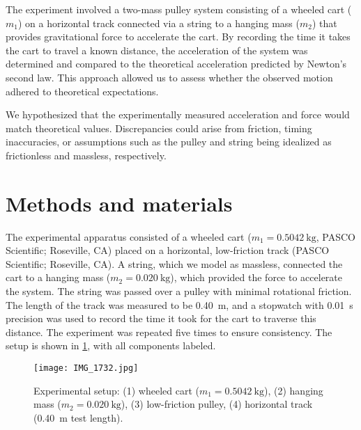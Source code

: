 \documentclass[reprint,amsmath,amssymb,aps]{revtex4-2}
\begin{document}
The experiment involved a two-mass pulley system consisting of a wheeled cart ($m_1$) on a horizontal track connected via a string to a hanging mass ($m_2$) that provides gravitational force to accelerate the cart. By recording the time it takes the cart to travel a known distance, the acceleration of the system was determined and compared to the theoretical acceleration predicted by Newton's second law. This approach allowed us to assess whether the observed motion adhered to theoretical expectations.

We hypothesized that the experimentally measured acceleration and force would match theoretical values. Discrepancies could arise from friction, timing inaccuracies, or assumptions such as the pulley and string being idealized as frictionless and massless, respectively.







\section{Methods and materials}
The experimental apparatus consisted of a wheeled cart ($m_1 = \qty{0.5042}{\kilo\gram}$, PASCO Scientific; Roseville, CA) placed on a horizontal, low-friction track (PASCO Scientific; Roseville, CA). A string, which we model as massless, connected the cart to a hanging mass ($m_2 = \qty{0.020}{\kilo\gram}$), which provided the force to accelerate the system. The string was passed over a pulley with minimal rotational friction. The length of the track was measured to be \qty{0.40}{\meter}, and a stopwatch with \qty{0.01}{\second} precision was used to record the time it took for the cart to traverse this distance. The experiment was repeated five times to ensure consistency. The setup is shown in \cref{fig:1}, with all components labeled.
\begin{figure}
\begin{center}
\texttt{[image: IMG\_1732.jpg]}
\end{center}
\caption{\label{fig:1} Experimental setup: (1) wheeled cart ($m_1=\qty{0.5042}{\kilo\gram}$), (2) hanging mass ($m_2=\qty{0.020}{\kilo\gram}$), (3) low-friction pulley, (4) horizontal track (\qty{0.40}{\meter} test length).}
\end{figure}
\end{document}
